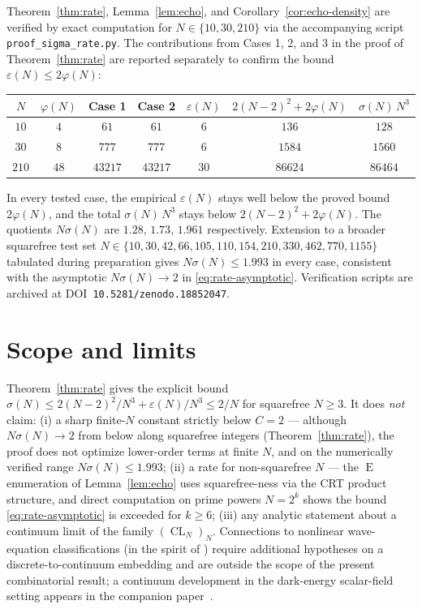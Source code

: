 \documentclass[11pt,reqno]{amsart}
\theoremstyle{plain}
\theoremstyle{definition}
\theoremstyle{remark}
\DeclareMathOperator{\CL}{CL}
\DeclareMathOperator{\ECHO}{E}
\begin{document}
Theorem~\ref{thm:rate}, Lemma~\ref{lem:echo}, and
Corollary~\ref{cor:echo-density} are verified by exact computation
for $N\in\{10,30,210\}$ via the accompanying script
\texttt{proof\_sigma\_rate.py}. The contributions from Cases 1, 2,
and 3 in the proof of Theorem~\ref{thm:rate} are reported
separately to confirm the bound $\varepsilon(N)\le 2\varphi(N)$:

\begin{center}
\begin{tabular}{c|c|c|c|c|c|c}
$N$ & $\varphi(N)$ & Case 1 & Case 2 & $\varepsilon(N)$ &
$2(N-2)^{2}+2\varphi(N)$ & $\sigma(N)\,N^{3}$\\
\hline
$10$  & $4$  & $61$    & $61$    & $6$  & $136$    & $128$\\
$30$  & $8$  & $777$   & $777$   & $6$  & $1584$   & $1560$\\
$210$ & $48$ & $43217$ & $43217$ & $30$ & $86624$  & $86464$\\
\end{tabular}
\end{center}

In every tested case, the empirical $\varepsilon(N)$ stays well
below the proved bound $2\varphi(N)$, and the total
$\sigma(N)\,N^{3}$ stays below $2(N-2)^{2}+2\varphi(N)$. The
quotients $N\sigma(N)$ are $1.28,\,1.73,\,1.961$ respectively.
Extension to a broader squarefree test set
$N\in\{10,30,42,66,105,110,154,210,330,462,770,1155\}$ tabulated
during preparation gives $N\sigma(N)\le 1.993$ in every case,
consistent with the asymptotic $N\sigma(N)\to 2$ in
\eqref{eq:rate-asymptotic}. Verification scripts are archived at
DOI~\texttt{10.5281/zenodo.18852047}.

\section{Scope and limits}\label{sec:scope}

Theorem~\ref{thm:rate} gives the explicit bound
$\sigma(N)\le 2(N-2)^{2}/N^{3}+\varepsilon(N)/N^{3}\le 2/N$ for
squarefree $N\ge 3$. It does \emph{not} claim:
(i) a sharp finite-$N$ constant strictly below $C=2$ --- although
$N\sigma(N)\to 2$ from below along squarefree integers
(Theorem~\ref{thm:rate}), the proof does not optimize lower-order
terms at finite $N$, and on the numerically verified range
$N\sigma(N)\le 1.993$;
(ii) a rate for non-squarefree $N$ --- the $\ECHO$ enumeration of
Lemma~\ref{lem:echo} uses squarefree-ness via the CRT product
structure, and direct computation on prime powers $N=2^{k}$ shows
the bound \eqref{eq:rate-asymptotic} is exceeded for $k\ge 6$;
(iii) any analytic statement about a continuum limit of the family
$(\CL_N)_{N}$. Connections to nonlinear wave-equation classifications
(in the spirit of \cite{BB1976}) require additional hypotheses on a
discrete-to-continuum embedding and are outside the scope of the
present combinatorial result; a continuum development in the
dark-energy scalar-field setting appears in the companion
paper~\cite{SandersGishJohnson2026JCAP}.
\end{document}
